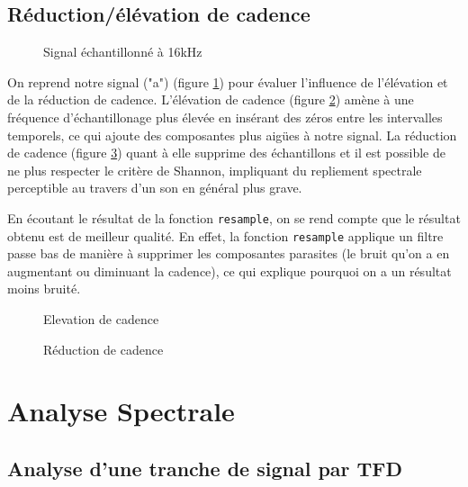 \documentclass[french]{article}
\begin{document}
\FloatBarrier
\subsection{Réduction/élévation de cadence}

\begin{figure}[h!]
	\centering
	
	\caption{Signal échantillonné à 16kHz}
	\label{fig:cadence_signal}
\end{figure}

On reprend notre signal ("a") (figure \ref{fig:cadence_signal}) pour évaluer l'influence de l'élévation et de la réduction de cadence.
L'élévation de cadence (figure \ref{fig:élévation}) amène à une fréquence d'échantillonage plus élevée en insérant des zéros entre les intervalles temporels, ce qui ajoute des composantes plus aigües à notre signal. La réduction de cadence (figure \ref{fig:réduction}) quant à elle supprime des échantillons et il est possible de ne plus respecter le critère de Shannon, impliquant du repliement spectrale perceptible au travers d'un son en général plus grave.

En écoutant le résultat de la fonction \verb`resample`, on se rend compte que le résultat obtenu est de meilleur qualité. En effet, la fonction \verb`resample` applique un filtre passe bas de manière à supprimer les composantes parasites (le bruit qu'on a en augmentant ou diminuant la cadence), ce qui explique pourquoi on a un résultat moins bruité.

\begin{figure}[h!]
	\centering
	
	\caption{Elevation de cadence}
	\label{fig:élévation}
\end{figure}

\begin{figure}[h!]
	\centering
	
	\caption{Réduction de cadence}
	\label{fig:réduction}
\end{figure}

\FloatBarrier
\section{Analyse Spectrale}
\subsection{Analyse d'une tranche de signal par TFD}
\end{document}
